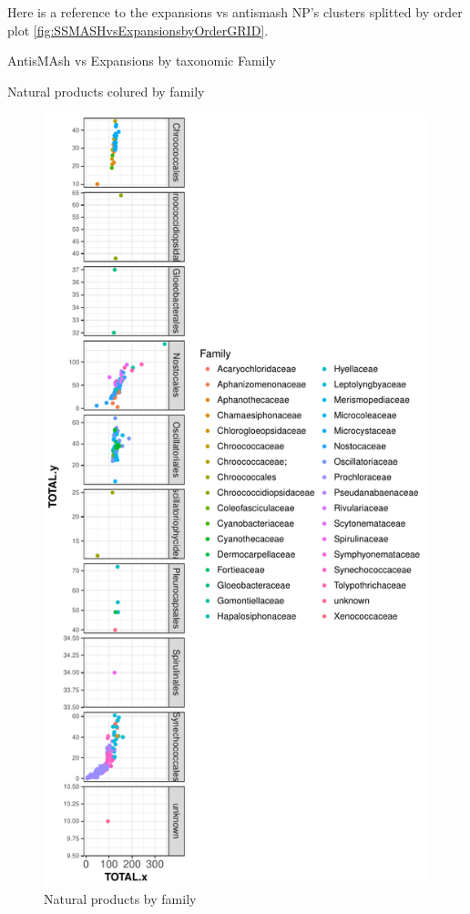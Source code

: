 \documentclass[12pt,twoside]{reedthesis}
\begin{document}
  Here is a reference to the expansions vs antismash NP's clusters
  splitted by order plot \autoref{fig:SSMASHvsExpansionsbyOrderGRID}.
  \clearpage 
  
  AntisMAsh vs Expansions by taxonomic Family
  
  Natural products colured by family
  
  \begin{figure}[h!tbp]
  \centering
  \includegraphics[angle = 0,scale = 0.6]{chapter5/npf.pdf}
  \caption[Natural products by family]{\normalsize{Natural products by family}}
  \label{fig:npf}
  \end{figure}
  
\end{document}
